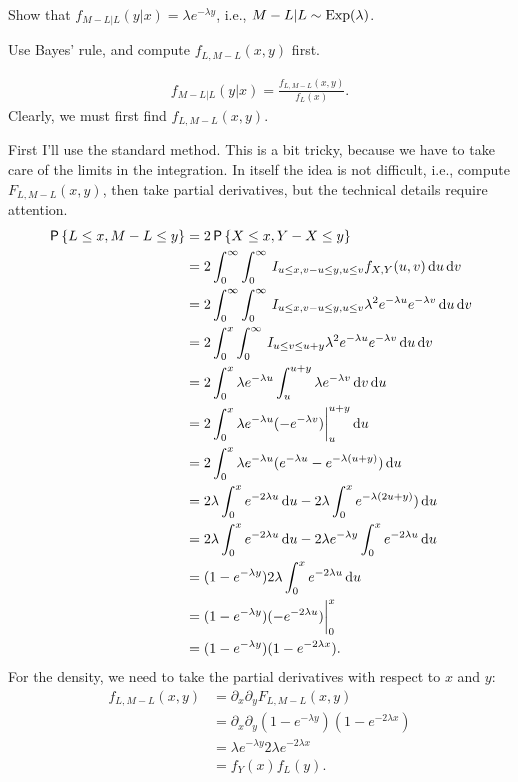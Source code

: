 \documentclass[a4paper,12pt]{article}
\begin{document}
\begin{exercise}\label{ex:5}
Show that $f_{M-L|L}(y| x) = \lambda e^{-\lambda y}$, i.e., $M-L| L \sim \mathrm{Exp}(\lambda)$.
\begin{hint}
Use Bayes' rule, and compute $f_{L, M-L}(x,y)$  first.
\end{hint}
\begin{solution}
  \begin{align}
    \label{eq:29}
f_{M-L| L}(y| x) =  \frac{f_{L, M-L}(x, y)}{f_L(x)}.
  \end{align}
Clearly, we must first find $f_{L, M-L}(x, y)$. 

First I'll use the standard method.
This is a bit tricky, because we have to take care of the limits in the integration.
In itself the idea is not difficult, i.e., compute $F_{L, M-L}(x, y)$, then take partial derivatives, but the technical details require attention.
\begin{align}  \label{eq:23}
\,\mathsf{P}\left\{L\leq x, M-L\leq y\right\} 
&= 2\,\mathsf{P}\left\{X\leq x, Y-X \leq y\right\} \\
&= 2\int_0^{\infty} \int_0^{\infty} \,I_{u\leq x, v-u\leq y, u \leq v} f_{X,Y}(u, v)  \,\textrm{d}u \,\textrm{d}v\\
&= 2\int_0^{\infty} \int_0^{\infty} \,I_{u\leq x, v-u\leq y, u\leq v} \lambda^2e^{-\lambda u}e^{-\lambda v}\,\textrm{d}u \,\textrm{d}v\\
&= 2\int_0^{x} \int_0^{\infty} \,I_{u\leq v\leq u+y} \lambda^2e^{-\lambda u}e^{-\lambda v}\,\textrm{d}u \,\textrm{d}v\\
&= 2\int_0^{x} \lambda e^{-\lambda u} \int_u   ^{u + y}  \lambda e^{-\lambda v}\,\textrm{d}v \,\textrm{d}u\\
&= 2\int_0^{x} \lambda e^{-\lambda u} (-e^{-\lambda v}) \biggr|_u^{u+y}\,\textrm{d}u \\
&= 2\int_0^{x} \lambda e^{-\lambda u} (e^{-\lambda u} - e^{-\lambda (u+y)})\,\textrm{d}u \\
&= 2\lambda\int_0^{x}  e^{-2 \lambda u}\,\textrm{d}u  - 2\lambda \int_{0}^{x} e^{-\lambda (2u+y)})\,\textrm{d}u \\
&= 2\lambda\int_0^{x}  e^{-2 \lambda u}\,\textrm{d}u  - 2\lambda e^{-\lambda y }\int_{0}^{x} e^{-2 \lambda u}\,\textrm{d}u \\
&= (1-e^{-\lambda y}) 2 \lambda \int_0^{x} e^{-2 \lambda u} \,\textrm{d}u\\ 
&= (1-e^{-\lambda y}) ( -e^{-2\lambda u}) \biggr|_0^{x} \\ 
&= (1-e^{-\lambda y})(1- e^{-2\lambda x}).
\end{align}
For the density, we need to take the partial derivatives with respect to $x$ and $y$: 
\begin{align}
  \label{eq:25}
f_{L, M-L}(x,y ) 
&= \partial_x\partial_{y} F_{L, M-L}(x,y)   \\
&= \partial_x\partial_{y} (1-e^{-\lambda y})(1- e^{-2\lambda x}) \\
&= \lambda e^{-\lambda y} 2\lambda  e^{-2\lambda x} \\
&= f_Y(x) f_L(y).
\end{align}


\end{solution}
\end{exercise}
\end{document}
